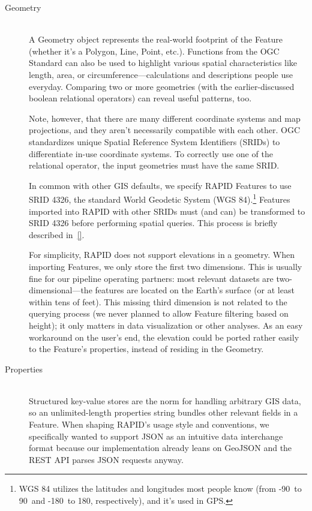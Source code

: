 \begin{description}
  \item[Geometry] \hfill \\
  A Geometry object represents the real-world footprint of the Feature (whether it's a Polygon, Line, Point, etc.). Functions from the OGC Standard can also be used to highlight various spatial characteristics like length, area, or circumference---calculations and descriptions people use everyday. Comparing two or more geometries (with the earlier-discussed boolean relational operators) can reveal useful patterns, too.
  
  Note, however, that there are many different coordinate systems and map projections, and they aren't necessarily compatible with each other. OGC standardizes unique Spatial Reference System Identifiers (SRIDs) to differentiate in-use coordinate systems. To correctly use one of the relational operator, the input geometries must have the same SRID.
  
  In common with other GIS defaults, we specify RAPID Features to use SRID 4326, the standard World Geodetic System (WGS 84).\footnote{WGS 84 utilizes the latitudes and longitudes most people know (from -90\textdegree~to 90\textdegree~and -180\textdegree~to 180\textdegree, respectively), and it's used in GPS.} Features imported into RAPID with other SRIDs must (and can) be transformed to SRID 4326 before performing spatial queries. This process is briefly described in~\ref{}.
   
   For simplicity, RAPID does not support elevations in a geometry. When importing Features, we only store the first two dimensions. This is usually fine for our pipeline operating partners: most relevant datasets are two-dimensional---the features are located on the Earth's surface (or at least within tens of feet). This missing third dimension is not related to the querying process (we never planned to allow Feature filtering based on height); it only matters in data visualization or other analyses. As an easy workaround on the user's end, the elevation could be ported rather easily to the Feature's properties, instead of residing in the Geometry.
  
  \item[Properties] \hfill \\
  Structured key-value stores are the norm for handling arbitrary GIS data, so an unlimited-length properties string bundles other relevant fields in a Feature. When shaping RAPID's usage style and conventions, we specifically wanted to support JSON as an intuitive data interchange format because our implementation already leans on GeoJSON and the REST API parses JSON requests anyway.
  

\end{description}
